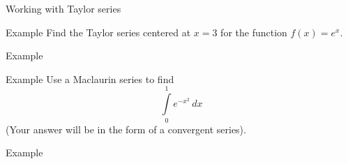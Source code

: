 \documentclass[presentation]{beamer}
\begin{document}
\begin{frame}[label={sec:orgf87fce0}]{Working with Taylor series}
\end{frame}

\begin{frame}[label={sec:org9dfdd3a}]{Example}
Find the Taylor series centered at \(x = 3\) for the function \(f(x) = e^x.\)
\vspace{10in}
\end{frame}

\begin{frame}[label={sec:orgc32e411}]{Example}
\end{frame}

\begin{frame}[label={sec:org8ccabb7}]{Example}
Use a Maclaurin series to find
\[
\int\limits_0^1 e^{-x^2}\,dx\]
(Your answer will be in the form of a convergent series).
\vspace{10in}
\end{frame}

\begin{frame}[label={sec:org3397ba3}]{Example}
\end{frame}
\end{document}
